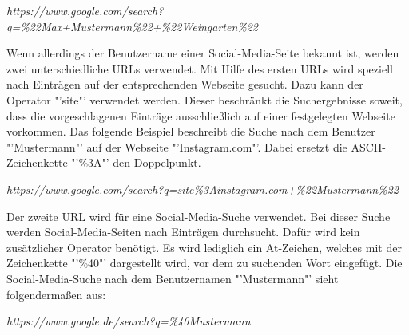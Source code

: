 			\textit{https://www.google.com/search?q=\%22Max+Mustermann\%22+\%22Weingarten\%22}
			
			Wenn allerdings der Benutzername einer Social-Media-Seite bekannt ist, werden zwei unterschiedliche URLs verwendet. Mit Hilfe des ersten URLs wird speziell nach Einträgen auf der entsprechenden Webseite gesucht. Dazu kann der Operator "'site"' verwendet werden. Dieser beschränkt die Suchergebnisse soweit, dass die vorgeschlagenen Einträge ausschließlich auf einer festgelegten Webseite vorkommen. Das folgende Beispiel beschreibt die Suche nach dem Benutzer "'Mustermann"' auf der Webseite "'Instagram.com"'. Dabei ersetzt die ASCII-Zeichenkette "'\%3A"' den Doppelpunkt. \cite{HTMLURL}
			
			\textit{https://www.google.com/search?q=site\%3Ainstagram.com+\%22Mustermann\%22}
			
			Der zweite URL wird für eine Social-Media-Suche verwendet. Bei dieser Suche werden Social-Media-Seiten nach Einträgen durchsucht. Dafür wird kein zusätzlicher Operator benötigt. Es wird lediglich ein At-Zeichen, welches mit der Zeichenkette "'\%40"' dargestellt wird, vor dem zu suchenden Wort eingefügt. Die Social-Media-Suche nach dem Benutzernamen "'Mustermann"' sieht folgendermaßen aus:\cite{SocialMediaSearch}
			
			\textit{https://www.google.de/search?q=\%40Mustermann}
			
